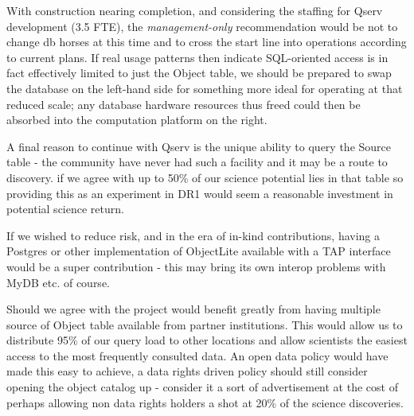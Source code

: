 With construction nearing completion, and considering the staffing for Qserv development (3.5 FTE), the \textit{management-only} recommendation would be not to change db horses at this time and to cross the start line into operations according to current plans.  If real usage patterns then indicate SQL-oriented access is in fact effectively limited to just the Object table, we should be prepared to swap the database on the left-hand side for something more ideal for operating at that reduced scale; any database hardware resources thus freed could then be absorbed into the computation platform on the right.

A final reason to continue with Qserv is the unique ability to query the Source table - the community have never had such a facility and it may be a route to discovery.  if we agree with  up to 50\% of our science potential lies in that table so providing this as an experiment in DR1 would seem a reasonable investment in potential science return.

If we wished to reduce risk, and in the era of in-kind contributions, having a Postgres or other implementation of ObjectLite available with a TAP interface would be a super contribution - this may bring its own interop problems with MyDB etc. of course.

Should we agree with  the project would benefit greatly from having multiple source of Object table available from partner institutions. This would allow us to distribute 95\% of our query load to other locations and allow scientists the easiest access to the most frequently consulted data.
An open data policy would have made this easy to achieve, a data rights driven policy should still consider opening the object catalog up - consider it a sort of advertisement at the cost of perhaps allowing non data rights holders a shot at 20\% of the science discoveries.

